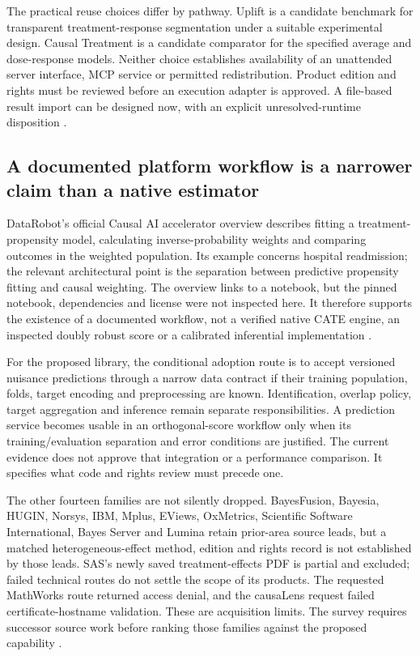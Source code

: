 The practical reuse choices differ by pathway. Uplift is a candidate
benchmark for transparent treatment-response segmentation under a suitable
experimental design. Causal Treatment is a candidate comparator for the
specified average and dose-response models. Neither choice establishes
availability of an unattended server interface, MCP service or permitted
redistribution. Product edition and rights must be reviewed before an
execution adapter is approved. A file-based result import can be designed
now, with an explicit unresolved-runtime disposition
\cite{exec13_ch_scope}.

\subsection{A documented platform workflow is a narrower claim than a native estimator}

DataRobot's official Causal AI accelerator overview describes fitting a
treatment-propensity model, calculating inverse-probability weights and
comparing outcomes in the weighted population. Its example concerns
hospital readmission; the relevant architectural point is the separation
between predictive propensity fitting and causal weighting. The overview
links to a notebook, but the pinned notebook, dependencies and license
were not inspected here. It therefore supports the existence of a
documented workflow, not a verified native CATE engine, an inspected
doubly robust score or a calibrated inferential implementation
\cite{exec13_ch_datarobot}.

For the proposed library, the conditional adoption route is to accept
versioned nuisance predictions through a narrow data contract if their
training population, folds, target encoding and preprocessing are known.
Identification, overlap policy, target aggregation and inference remain
separate responsibilities. A prediction service becomes usable in an
orthogonal-score workflow only when its training/evaluation separation
and error conditions are justified. The current evidence does not approve
that integration or a performance comparison. It specifies what code and
rights review must precede one.

The other fourteen families are not silently dropped. BayesFusion, Bayesia,
HUGIN, Norsys, IBM, Mplus, EViews, OxMetrics, Scientific Software
International, Bayes Server and Lumina retain prior-area source leads,
but a matched heterogeneous-effect method, edition and rights record is
not established by those leads. SAS's newly saved treatment-effects PDF
is partial and excluded; failed technical routes do not settle the scope
of its products. The requested MathWorks route returned access denial,
and the causaLens request failed certificate-hostname validation. These
are acquisition limits. The survey requires successor source work before
ranking those families against the proposed capability
\cite{exec13_ch_scope}.

